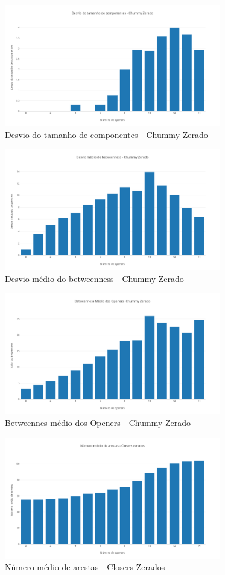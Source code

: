 \documentclass[12pt]{article}
\begin{document}
\begin{figure}[H]
	\centering
	\includegraphics[width=\textwidth, height=200px]{basic-bar_3.png}
	\caption{Desvio do tamanho de componentes - Chummy Zerado}
	\label{fig3}
\end{figure}

\begin{figure}[H]
	\centering
	\includegraphics[width=\textwidth, height=200px]{basic-bar_4.png}
	\caption{Desvio médio do betweenness - Chummy Zerado}
	\label{fig4}
\end{figure}

\begin{figure}[H]
	\centering
	\includegraphics[width=\textwidth, height=200px]{basic-bar_5.png}
	\caption{Betweennes médio dos Openers - Chummy Zerado}
	\label{fig5}
\end{figure}

\begin{figure}[H]
	\centering
	\includegraphics[width=\textwidth, height=200px]{basic-bar_6.png}
	\caption{Número médio de arestas - Closers Zerados}
	\label{fig6}
\end{figure}
\end{document}
